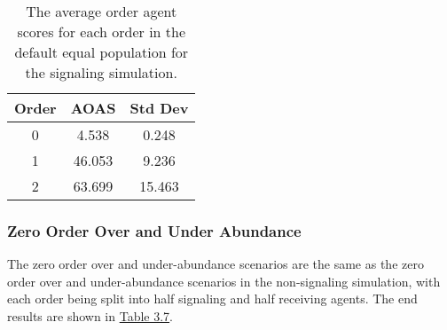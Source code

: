 \begin{table}[h]
    \centering
    \begin{tabular}{|c|c|c|}
    \hline
    Order & AOAS & Std Dev \\
    \hline
    0     & 4.538   & 0.248    \\
    1     & 46.053  & 9.236    \\
    2     & 63.699  & 15.463   \\
    \hline
    \end{tabular}
    \caption{The average order agent scores for each order in the default equal population for the signaling simulation.}
    \label{table:sig-default-equal-overall}
\end{table}

\subsubsection{Zero Order Over and Under Abundance}

The zero order over and under-abundance scenarios are the same as the zero order over and under-abundance scenarios in the non-signaling simulation, with each order being split into half signaling and half receiving agents. The end results are shown in \hyperref[table:sig-zero-order-simple]{Table 3.7}.

